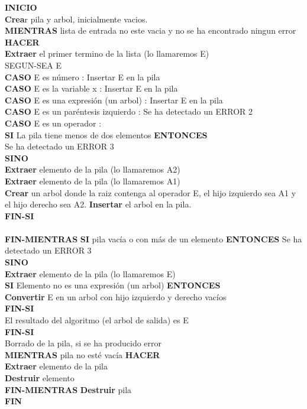 \documentclass[12pt]{article}
\begin{document}
\begin{tabla}
\textbf{INICIO} \\
    \textbf{Crea}r pila y arbol, inicialmente vacios.\\
    \textbf{MIENTRAS} lista de entrada no este vacia y no se ha encontrado ningun error \textbf{HACER}\\ 
\textbf{Extraer} el primer termino de la lista (lo llamaremos E)\\
SEGUN-SEA E\\
        \textbf{CASO} E es número : Insertar E en la pila \\ 
	 \textbf{CASO} E es la variable x : Insertar E en la pila \\ 
	 \textbf{CASO} E es una expresión (un arbol) : Insertar E en la pila \\ 
	 \textbf{CASO} E es un paréntesis izquierdo : Se ha detectado un ERROR 2\\ 
	 \textbf{CASO} E es un operador : \\ 
	   \textbf{SI} La pila tiene menos de dos elementos \textbf{ENTONCES}\\
             Se ha detectado un ERROR 3\\
	   \textbf{SINO}\\
	     \textbf{Extraer} elemento de la pila (lo llamaremos A2)\\
	     \textbf{Extraer} elemento de la pila (lo llamaremos A1)\\
	     \textbf{Crear} un arbol donde la raiz contenga al operador E,
             el hijo izquierdo sea A1 y el hijo derecho sea A2.
	     \textbf{Insertar} el arbol en la pila.\\
     \textbf{FIN-SI}\\
       \\
   \textbf{FIN-MIENTRAS}
    \textbf{SI} pila vacía o con más de un elemento \textbf{ENTONCES}
      Se ha detectado un ERROR 3 \\
    \textbf{SINO}\\
      \textbf{Extraer} elemento de la pila (lo llamaremos E)\\
      \textbf{SI} Elemento no es una expresión (un arbol) \textbf{ENTONCES}\\
	\textbf{Convertir} E en un arbol con hijo izquierdo y derecho vacíos\\
     \textbf{FIN-SI}\\
      El resultado del algoritmo (el arbol de salida) es E\\
   \textbf{FIN-SI}\\
    {Borrado de la pila, si se ha producido error }\\
    \textbf{MIENTRAS} pila no esté vacía \textbf{HACER}\\
      \textbf{Extraer} elemento de la pila\\
      \textbf{Destruir} elemento \\
    \textbf{FIN-MIENTRAS}
    \textbf{Destruir} pila\\
  \textbf{FIN}\\


\end{tabla}
\end{document}
